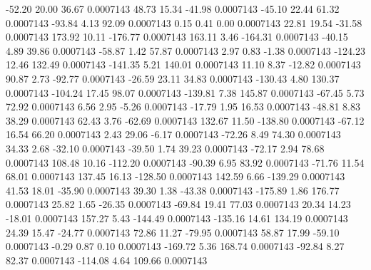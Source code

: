      -52.20       20.00       36.67     0.0007143
       48.73       15.34      -41.98     0.0007143
      -45.10       22.44       61.32     0.0007143
      -93.84        4.13       92.09     0.0007143
        0.15        0.41        0.00     0.0007143
       22.81       19.54      -31.58     0.0007143
      173.92       10.11     -176.77     0.0007143
      163.11        3.46     -164.31     0.0007143
      -40.15        4.89       39.86     0.0007143
      -58.87        1.42       57.87     0.0007143
        2.97        0.83       -1.38     0.0007143
     -124.23       12.46      132.49     0.0007143
     -141.35        5.21      140.01     0.0007143
       11.10        8.37      -12.82     0.0007143
       90.87        2.73      -92.77     0.0007143
      -26.59       23.11       34.83     0.0007143
     -130.43        4.80      130.37     0.0007143
     -104.24       17.45       98.07     0.0007143
     -139.81        7.38      145.87     0.0007143
      -67.45        5.73       72.92     0.0007143
        6.56        2.95       -5.26     0.0007143
      -17.79        1.95       16.53     0.0007143
      -48.81        8.83       38.29     0.0007143
       62.43        3.76      -62.69     0.0007143
      132.67       11.50     -138.80     0.0007143
      -67.12       16.54       66.20     0.0007143
        2.43       29.06       -6.17     0.0007143
      -72.26        8.49       74.30     0.0007143
       34.33        2.68      -32.10     0.0007143
      -39.50        1.74       39.23     0.0007143
      -72.17        2.94       78.68     0.0007143
      108.48       10.16     -112.20     0.0007143
      -90.39        6.95       83.92     0.0007143
      -71.76       11.54       68.01     0.0007143
      137.45       16.13     -128.50     0.0007143
      142.59        6.66     -139.29     0.0007143
       41.53       18.01      -35.90     0.0007143
       39.30        1.38      -43.38     0.0007143
     -175.89        1.86      176.77     0.0007143
       25.82        1.65      -26.35     0.0007143
      -69.84       19.41       77.03     0.0007143
       20.34       14.23      -18.01     0.0007143
      157.27        5.43     -144.49     0.0007143
     -135.16       14.61      134.19     0.0007143
       24.39       15.47      -24.77     0.0007143
       72.86       11.27      -79.95     0.0007143
       58.87       17.99      -59.10     0.0007143
       -0.29        0.87        0.10     0.0007143
     -169.72        5.36      168.74     0.0007143
      -92.84        8.27       82.37     0.0007143
     -114.08        4.64      109.66     0.0007143
